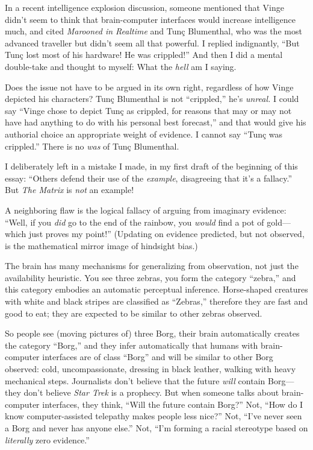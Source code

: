 {
 In a recent intelligence explosion discussion, someone mentioned
that Vinge didn't seem to think that brain-computer
interfaces would increase intelligence much, and cited \textit{Marooned
in Realtime} and Tunç Blumenthal, who was the most advanced traveller
but didn't seem all that powerful. I replied
indignantly, ``But Tunç lost most of his hardware! He
was crippled!'' And then I did a mental double-take
and thought to myself: What the \textit{hell} am I saying.}

{
 Does the issue not have to be argued in its own right, regardless
of how Vinge depicted his characters? Tunç Blumenthal is not
``crippled,'' he's
\textit{unreal.} I could say ``Vinge chose to depict
Tunç as crippled, for reasons that may or may not have had anything to
do with his personal best forecast,'' and that would
give his authorial choice an appropriate weight of evidence. I cannot
say ``Tunç was crippled.'' There is
no \textit{was} of Tunç Blumenthal.}

{
 I deliberately left in a mistake I made, in my first draft of the
beginning of this essay: ``Others defend their use of
the \textit{example}, disagreeing that it's a
fallacy.'' But \textit{The Matrix} is \textit{not} an
example!}

{
 A neighboring flaw is the logical fallacy of arguing from
imaginary evidence: ``Well, if you \textit{did} go to
the end of the rainbow, you \textit{would} find a pot of gold---which
just proves my point!'' (Updating on evidence
predicted, but not observed, is the mathematical mirror image of
hindsight bias.)}

{
 The brain has many mechanisms for generalizing from observation,
not just the availability heuristic. You see three zebras, you form the
category ``zebra,'' and this
category embodies an automatic perceptual inference. Horse-shaped
creatures with white and black stripes are classified as
``Zebras,'' therefore they are fast
and good to eat; they are expected to be similar to other zebras
observed.}

{
 So people see (moving pictures of) three Borg, their brain
automatically creates the category
``Borg,'' and they infer
automatically that humans with brain-computer interfaces are of class
``Borg'' and will be similar to
other Borg observed: cold, uncompassionate, dressing in black leather,
walking with heavy mechanical steps. Journalists don't
believe that the future \textit{will} contain Borg---they
don't believe \textit{Star Trek} is a prophecy. But
when someone talks about brain-computer interfaces, they think,
``Will the future contain Borg?''
Not, ``How do I know computer-assisted telepathy makes
people less nice?'' Not,
``I've never seen a Borg and never has
anyone else.'' Not,
``I'm forming a racial stereotype
based on \textit{literally} zero evidence.''}

